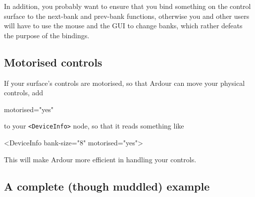 \documentclass[10pt,a4paper]{book}
\begin{document}
In addition, you probably want to ensure that you bind something on
the control surface to the next-bank and prev-bank functions,
otherwise you and other users will have to use the mouse and the GUI
to change banks, which rather defeats the purpose of the bindings.

\subsection{Motorised controls}

If your surface's controls are motorised, so that Ardour can move your physical controls,
add

\begin{listing}
motorised="yes"
\end{listing}

to your \texttt{<DeviceInfo>} node, so that it reads something like

\begin{listing}
<DeviceInfo bank-size="8" motorised="yes">
\end{listing}

This will make Ardour more efficient in handling your controls.

\subsection{A complete (though muddled) example}
\end{document}
